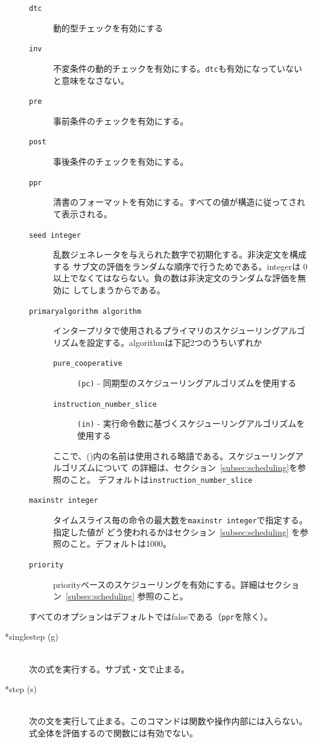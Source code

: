 \documentclass[\pformat,12pt]{jarticle}
\begin{document}
\begin{description}
  \begin{description}
  \item[{\tt dtc}] 動的型チェックを有効にする
  \item[{\tt inv}] 不変条件の動的チェックを有効にする。{\tt dtc}も有効になっていないと意味をなさない。
  \item[{\tt pre}] 事前条件のチェックを有効にする。
  \item[{\tt post}] 事後条件のチェックを有効にする。
  \item[{\tt ppr}] 清書のフォーマットを有効にする。すべての値が構造に従ってされて表示される。
  \item[{\tt seed integer}]
    乱数ジェネレータを与えられた数字で初期化する。非決定文を構成する
    サブ文の評価をランダムな順序で行うためである。integerは
     0以上でなくてはならない。負の数は非決定文のランダムな評価を無効に
    してしまうからである。
  \item[{\tt primaryalgorithm algorithm}]
    インタープリタで使用されるプライマリのスケジューリングアルゴリズムを設定する。algorithmは下記2つのうちいずれか
    \begin{description}
    \item[{\tt pure\_cooperative}] \texttt{(pc)} - 同期型のスケジューリングアルゴリズムを使用する
    \item[{\tt instruction\_number\_slice}] \texttt{(in)} - 実行命令数に基づくスケジューリングアルゴリズムを使用する
    \end{description}
    ここで、()内の名前は使用される略語である。スケジューリングアルゴリズムについて
    の詳細は、セクション~\ref{subsec:scheduling}を参照のこと。
    デフォルトは{\tt instruction\_number\_slice}
  \item[{\tt maxinstr integer}]
    タイムスライス毎の命令の最大数を{\tt maxinstr integer}で指定する。指定した値が
    どう使われるかはセクション~\ref{subsec:scheduling} を参照のこと。デフォルトは1000。
  \item[{\tt priority}]
    priorityベースのスケジューリングを有効にする。詳細はセクション~\ref{subsec:scheduling} 参照のこと。
  \end{description}
  
  すべてのオプションはデフォルトではfalseである（{\tt ppr}を除く）。
 
\item[*singlestep (g)] \mbox{}\\
  次の式を実行する。サブ式・文で止まる。

\item[*step (s)] \mbox{}\\
  次の文を実行して止まる。このコマンドは関数や操作内部には入らない。
  式全体を評価するので関数には有効でない。


\end{description}
\end{document}
